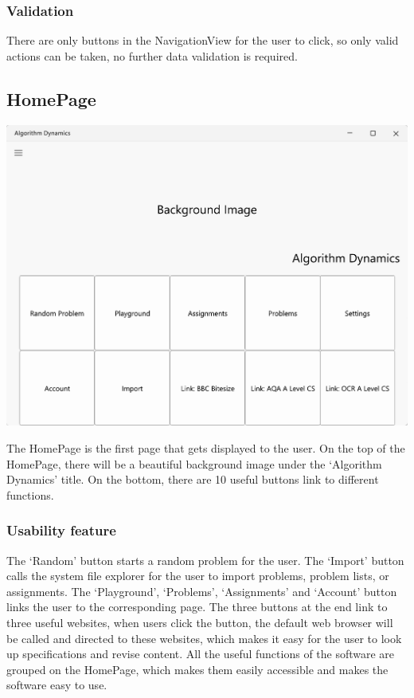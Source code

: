 \documentclass[a4paper]{report}
\begin{document}
\subsubsection{Validation}

There are only buttons in the NavigationView for the user to click, so only valid actions can be taken, no further data validation is required.

\subsection{HomePage}
\label{sec:HomePageDesign}

\includegraphics[width=\textwidth, height=\textheight, keepaspectratio]{HomePage-design}

The HomePage is the first page that gets displayed to the user. On the top of the HomePage, there will be a beautiful background image under the `Algorithm Dynamics' title. On the bottom, there are 10 useful buttons link to different functions.

\subsubsection{Usability feature}

The `Random' button starts a random problem for the user. The `Import' button calls the system file explorer for the user to import problems, problem lists, or assignments. The `Playground', `Problems', `Assignments' and `Account' button links the user to the corresponding page. The three buttons at the end link to three useful websites, when users click the button, the default web browser will be called and directed to these websites, which makes it easy for the user to look up specifications and revise content. All the useful functions of the software are grouped on the HomePage, which makes them easily accessible and makes the software easy to use.
\end{document}
